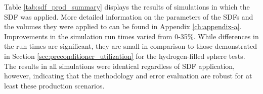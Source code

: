 
\begin{table}
  \small
    \caption[A summary of SDF application in production DAGMC models.]{A summary
      of SDF application to several production DAGMC models.}
    \label{tab:sdf_prod_summary}
\end{table}

Table \ref{tab:sdf_prod_summary} displays the results of simulations in which
the SDF was applied. More detailed information on the parameters of the SDFs and
the volumes they were applied to can be found in Appendix
\ref{ch:appendix-a}. Improvements in the simulation run times varied from
0-35\%. While differences in the run times are significant, they are small in
comparison to those demonstrated in Section \ref{sec:preconditioner_utilization}
for the hydrogen-filled sphere tests. The results in all simulations were
identical regardless of SDF application, however, indicating that the
methodology and error evaluation are robust for at least these production
scenarios.

